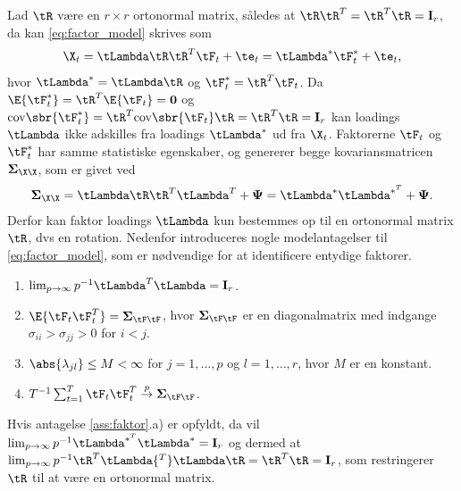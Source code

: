 Lad \(\tR\) være en \(r \times r\) ortonormal matrix, således at \(\tR \tR^T = \tR^T \tR = \mathbf{I}_r\), da kan \eqref{eq:factor_model} skrives som
\begin{align*}
\X_t = \tLambda \tR \tR^T \tF_t + \te_t = \tLambda^* \tF_t^* + \te_t,
\end{align*}
hvor \(\tLambda^*=\tLambda \tR\) og \(\tF_t^*=\tR^T \tF_t\). 
Da \(\E{\tF_t^*} = \tR^T \E{\tF_t} = \mathbf{0}\) og \(\text{cov} \sbr{\tF^*_t} = \tR^T \text{cov} \sbr{\tF_t} \tR = \tR^T \tR = \mathbf{I}_r\) kan loadings \(\tLambda\) ikke adskilles fra loadings \(\tLambda^*\) ud fra \(\X_t\).
Faktorerne \(\tF_t\) og \(\tF^*_t\) har samme statistiske egenskaber, og genererer begge kovariansmatricen \(\boldsymbol{\Sigma}_{\X \X}\), som er givet ved
\begin{align*}
\boldsymbol{\Sigma}_{\X \X} = \tLambda \tR \tR^T \tLambda^T + \boldsymbol{\Psi} = \tLambda^* \tLambda^{*^T} + \boldsymbol{\Psi}.
\end{align*}
Derfor kan faktor loadings \(\tLambda\) kun bestemmes op til en ortonormal matrix \(\tR\), dvs en rotation.
Nedenfor introduceres nogle modelantagelser til \eqref{eq:factor_model}, som er nødvendige for at identificere entydige faktorer.
%
\begin{ass} \label{ass:faktor}
\begin{enumerate}[label=\alph*)]
\item \(\lim_{p \rightarrow \infty} p^{-1} \tLambda^T \tLambda = \mathbf{I}_r\). 
\item \(\E{\tF_t \tF_t^T} = \boldsymbol{\Sigma}_{\tF\tF}\), hvor \(\boldsymbol{\Sigma}_{\tF\tF}\) er en diagonalmatrix med indgange \(\sigma_{ii} > \sigma_{jj} > 0\) for \(i < j\).
\item \(\abs{\lambda_{jl}} \leq M < \infty\) for \(j = 1, \ldots, p\) og \(l= 1, \ldots, r\), hvor \(M\) er en konstant.
\item \(T^{-1} \sum_{t=1}^T \tF_t \tF_t^T \overset{p}{\rightarrow} \boldsymbol{\Sigma}_{\tF\tF}\).
\end{enumerate}
\end{ass}
%
Hvis antagelse \ref{ass:faktor}.a) er opfyldt, da vil \(\lim_{p \rightarrow \infty} p^{-1} \tLambda^{*^T} \tLambda^* = \mathbf{I}_r\) og dermed at \(\lim_{p \rightarrow \infty} p^{-1} \tR^T \tLambda{^T} \tLambda \tR = \tR^T \tR = \mathbf{I}_r\), som restringerer \(\tR\) til at være en ortonormal matrix.
